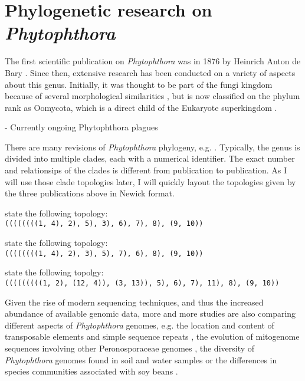 \section{Phylogenetic research on \textit{Phytophthora}} 

The first scientific publication on \textit{Phytophthora} was in 1876 by
Heinrich Anton de Bary \cite{kroonGenusPhytophthoraAnno2012} . Since then, extensive research has been conducted on
a variety of aspects about this genus. Initially, it was thought to be part of
the fungi kingdom because of several morphological similarities
, but is now classified on the phylum rank as Oomycota, which is
a direct child of the Eukaryote superkingdom .

- Currently ongoing Phytophthora plagues

There are many revisions of \textit{Phytophthora} phylogeny, e.g.
\cite{kroonGenusPhytophthoraAnno2012,yangExpandedPhylogenyGenus2017,abadPhytophthoraTaxonomicPhylogenetic2023a}.
Typically, the genus is divided into multiple clades, each with a numerical
identifier. The exact number and relationsips of the clades is different from
publication to publication. As I will use those clade topologies later, I will
quickly layout the topologies given by the three publications above in Newick
format.

 state the following topology:\\
\texttt{((((((((1, 4), 2), 5), 3), 6), 7), 8), (9, 10))}\cite{kroonGenusPhytophthoraAnno2012}

 state the following topology:\\
\texttt{((((((((1, 4), 2), 3), 5), 7), 6), 8), (9, 10))}\cite{yangExpandedPhylogenyGenus2017}

 state the following topolgy:\\
\texttt{(((((((((1, 2), (12, 4)), (3, 13)), 5), 6), 7), 11), 8), (9, 10))}\cite{abadPhytophthoraTaxonomicPhylogenetic2023a}


Given the rise of modern sequencing techniques, and thus the increased abundance
of available genomic data, more and more studies are also comparing different
aspects of \textit{Phytophthora} genomes, e.g. the location and content of
transposable elements and simple sequence repeats
\cite{mandalComparativeGenomeAnalysis2022}, the evolution of mitogenome
sequences involving other Peronosporaceae genomes
\cite{winkworthComparativeAnalysesComplete2022}, the diversity of
\textit{Phytophthora} genomes found in soil and water samples
\cite{catalaUseGenusSpecificAmplicon2015} or the differences in species
communities associated with soy beans
\cite{navarroComparisonSpeciesCommunities2021}.

